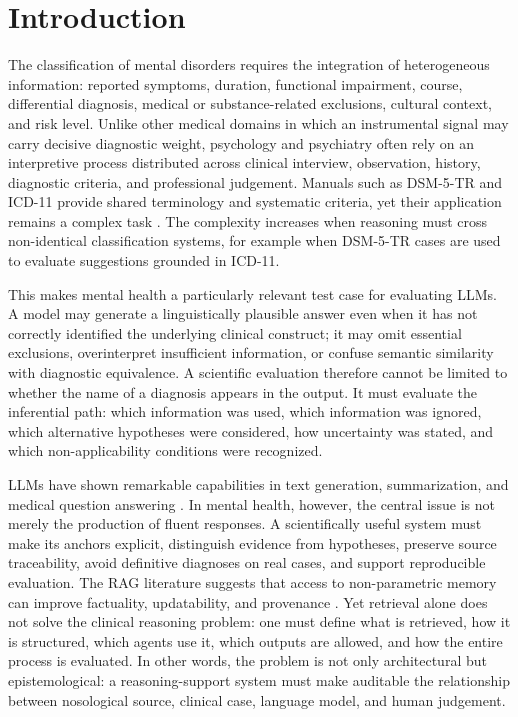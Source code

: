 \documentclass[11pt,a4paper]{article}
\begin{document}
\section{Introduction}
The classification of mental disorders requires the integration of heterogeneous information: reported symptoms, duration, functional impairment, course, differential diagnosis, medical or substance-related exclusions, cultural context, and risk level. Unlike other medical domains in which an instrumental signal may carry decisive diagnostic weight, psychology and psychiatry often rely on an interpretive process distributed across clinical interview, observation, history, diagnostic criteria, and professional judgement. Manuals such as DSM-5-TR and ICD-11 provide shared terminology and systematic criteria, yet their application remains a complex task \citep{apa2022dsm5tr,who2022icd11,who2024cddr}. The complexity increases when reasoning must cross non-identical classification systems, for example when DSM-5-TR cases are used to evaluate suggestions grounded in ICD-11.

This makes mental health a particularly relevant test case for evaluating LLMs. A model may generate a linguistically plausible answer even when it has not correctly identified the underlying clinical construct; it may omit essential exclusions, overinterpret insufficient information, or confuse semantic similarity with diagnostic equivalence. A scientific evaluation therefore cannot be limited to whether the name of a diagnosis appears in the output. It must evaluate the inferential path: which information was used, which information was ignored, which alternative hypotheses were considered, how uncertainty was stated, and which non-applicability conditions were recognized.

LLMs have shown remarkable capabilities in text generation, summarization, and medical question answering \citep{singhal2023medpalm,peng2023medical}. In mental health, however, the central issue is not merely the production of fluent responses. A scientifically useful system must make its anchors explicit, distinguish evidence from hypotheses, preserve source traceability, avoid definitive diagnoses on real cases, and support reproducible evaluation. The RAG literature suggests that access to non-parametric memory can improve factuality, updatability, and provenance \citep{lewis2020rag,li2022survey}. Yet retrieval alone does not solve the clinical reasoning problem: one must define what is retrieved, how it is structured, which agents use it, which outputs are allowed, and how the entire process is evaluated. In other words, the problem is not only architectural but epistemological: a reasoning-support system must make auditable the relationship between nosological source, clinical case, language model, and human judgement.
\end{document}
